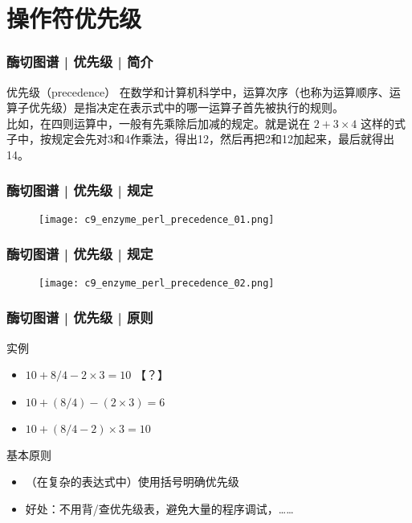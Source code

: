 \section{操作符优先级}
\begin{frame}
  \frametitle{酶切图谱 | 优先级 | 简介}
  \begin{block}{优先级（precedence）}
    在数学和计算机科学中，运算次序（也称为运算顺序、运算子优先级）是指决定在表示式中的哪一运算子首先被执行的规则。\\
    \vspace{1em}
    比如，在四则运算中，一般有先乘除后加减的规定。就是说在 $2 + 3 \times 4 $ 这样的式子中，按规定会先对3和4作乘法，得出12，然后再把2和12加起来，最后就得出14。
  \end{block}
\end{frame}

\begin{frame}
  \frametitle{酶切图谱 | 优先级 | 规定}
  \begin{figure}
    \centering
    \texttt{[image: c9\_enzyme\_perl\_precedence\_01.png]}
  \end{figure}
\end{frame}

\begin{frame}
  \frametitle{酶切图谱 | 优先级 | 规定}
  \begin{figure}
    \centering
    \texttt{[image: c9\_enzyme\_perl\_precedence\_02.png]}
  \end{figure}
\end{frame}

\begin{frame}
  \frametitle{酶切图谱 | 优先级 | 原则}
  \begin{block}{实例}
    \begin{itemize}
      \item $10 + 8 / 4 - 2 \times 3 = 10$ \alert{【？】}
      \item $10 + (8 / 4) - (2 \times 3) = 6$
      \item $10 + (8 / 4 - 2) \times 3 = 10$
    \end{itemize}
  \end{block}
  \pause
  \begin{block}{\alert{基本原则}}
    \begin{itemize}
      \item （在复杂的表达式中）使用括号明确优先级
      \item 好处：不用背/查优先级表，避免大量的程序调试，……
    \end{itemize}
  \end{block}
\end{frame}

